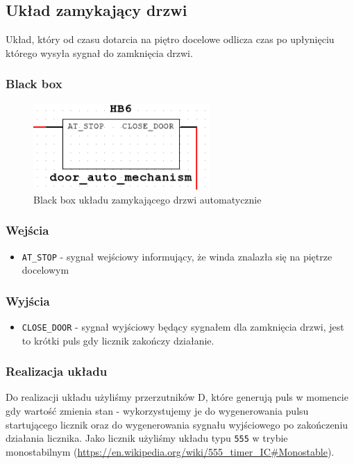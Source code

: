 \documentclass[a4paper]{article}
\begin{document}
\subsection{Układ zamykający drzwi}
Układ, który od czasu dotarcia na piętro docelowe odlicza czas po upłynięciu którego wysyła 
sygnał do zamknięcia drzwi. 

\subsubsection{Black box}
\begin{figure}[H]
    \centering
    \includegraphics[width=0.6\textwidth]{door_auto_mechanism.png}
    \caption{Black box układu zamykającego drzwi automatycznie}
\end{figure}

\subsubsection{Wejścia}
\begin{itemize}
    \item \verb|AT_STOP| - sygnał wejściowy informujący, że winda znalazła się na piętrze docelowym
\end{itemize}
\subsubsection{Wyjścia}
\begin{itemize}
    \item \verb|CLOSE_DOOR| - sygnał wyjściowy będący sygnałem dla zamknięcia drzwi, jest to krótki puls 
        gdy licznik zakończy działanie.
\end{itemize}
\subsubsection{Realizacja układu}
Do realizacji układu użyliśmy przerzutników D, które generują puls w momencie gdy wartość zmienia stan - wykorzystujemy
je do wygenerowania pulsu startującego licznik oraz do wygenerowania sygnału wyjściowego po zakończeniu działania licznika.
Jako licznik użyliśmy układu typu \verb|555| w trybie monostabilnym (\url{https://en.wikipedia.org/wiki/555_timer_IC#Monostable}).
\end{document}
